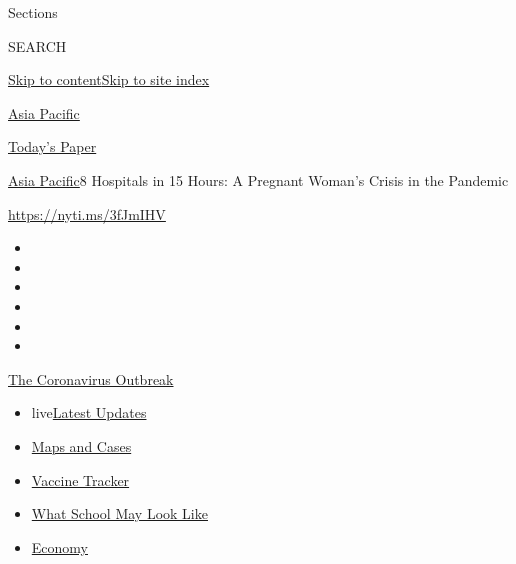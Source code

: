 Sections

SEARCH

\protect\hyperlink{site-content}{Skip to
content}\protect\hyperlink{site-index}{Skip to site index}

\href{https://www.nytimes.com/section/world/asia}{Asia Pacific}

\href{https://myaccount.nytimes.com/auth/login?response_type=cookie\&client_id=vi}{}

\href{https://www.nytimes.com/section/todayspaper}{Today's Paper}

\href{/section/world/asia}{Asia Pacific}\textbar{}8 Hospitals in 15
Hours: A Pregnant Woman's Crisis in the Pandemic

\url{https://nyti.ms/3fJmIHV}

\begin{itemize}
\item
\item
\item
\item
\item
\item
\end{itemize}

\href{https://www.nytimes.com/news-event/coronavirus?action=click\&pgtype=Article\&state=default\&region=TOP_BANNER\&context=storylines_menu}{The
Coronavirus Outbreak}

\begin{itemize}
\tightlist
\item
  live\href{https://www.nytimes.com/2020/08/01/world/coronavirus-covid-19.html?action=click\&pgtype=Article\&state=default\&region=TOP_BANNER\&context=storylines_menu}{Latest
  Updates}
\item
  \href{https://www.nytimes.com/interactive/2020/us/coronavirus-us-cases.html?action=click\&pgtype=Article\&state=default\&region=TOP_BANNER\&context=storylines_menu}{Maps
  and Cases}
\item
  \href{https://www.nytimes.com/interactive/2020/science/coronavirus-vaccine-tracker.html?action=click\&pgtype=Article\&state=default\&region=TOP_BANNER\&context=storylines_menu}{Vaccine
  Tracker}
\item
  \href{https://www.nytimes.com/interactive/2020/07/29/us/schools-reopening-coronavirus.html?action=click\&pgtype=Article\&state=default\&region=TOP_BANNER\&context=storylines_menu}{What
  School May Look Like}
\item
  \href{https://www.nytimes.com/live/2020/07/31/business/stock-market-today-coronavirus?action=click\&pgtype=Article\&state=default\&region=TOP_BANNER\&context=storylines_menu}{Economy}
\end{itemize}

